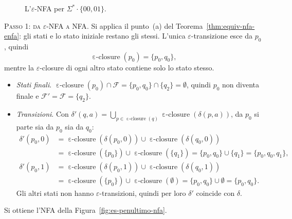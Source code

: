 \documentclass[a4paper, 11pt, oneside]{book}
\theoremstyle{formale}
\DeclareMathOperator{\eclosure}{\varepsilon\text{-}closure}
\begin{document}
    \begin{figure}[H]
        \centering
        \caption{L'$\varepsilon$-NFA per $\Sigma^* \cdot \{00, 01\}$.}
        \label{fig:es-penultimo-enfa}
    \end{figure}

    \textsc{Passo 1: da $\varepsilon$-NFA a NFA}. Si applica il punto~(a) del
    Teorema~\ref{thm:equiv-nfa-enfa}: gli stati e lo stato iniziale restano gli stessi.
    L'unica $\varepsilon$-transizione esce da $p_0$, quindi
    \begin{equation*}
        \eclosure(p_0) = \{p_0, q_0\},
    \end{equation*}
    mentre la $\varepsilon$-closure di ogni altro stato contiene solo lo stato stesso.
    \begin{itemize}
        \item \emph{Stati finali}. $\eclosure(p_0) \cap \mathcal{F} = \{p_0, q_0\} \cap
            \{q_2\} = \emptyset$, quindi $p_0$ non diventa finale e
            $\mathcal{F}' = \mathcal{F} = \{q_2\}$.
        \item \emph{Transizioni}. Con
            $\delta'(q, a) = \bigcup_{p \in \eclosure(q)} \eclosure(\delta(p, a))$, da
            $p_0$ si parte sia da $p_0$ sia da $q_0$:
            \begin{align*}
                \delta'(p_0, 0) &= \eclosure(\delta(p_0, 0)) \cup \eclosure(\delta(q_0, 0))
                    \\
                &= \eclosure(\{p_0\}) \cup \eclosure(\{q_1\})
                    = \{p_0, q_0\} \cup \{q_1\} = \{p_0, q_0, q_1\}, \\
                \delta'(p_0, 1) &= \eclosure(\delta(p_0, 1)) \cup \eclosure(\delta(q_0, 1))
                    \\
                &= \eclosure(\{p_0\}) \cup \eclosure(\emptyset)
                    = \{p_0, q_0\} \cup \emptyset = \{p_0, q_0\}.
            \end{align*}
            Gli altri stati non hanno $\varepsilon$-transizioni, quindi per loro $\delta'$
            coincide con $\delta$.
    \end{itemize}
    Si ottiene l'NFA della Figura~\ref{fig:es-penultimo-nfa}.
\end{document}
